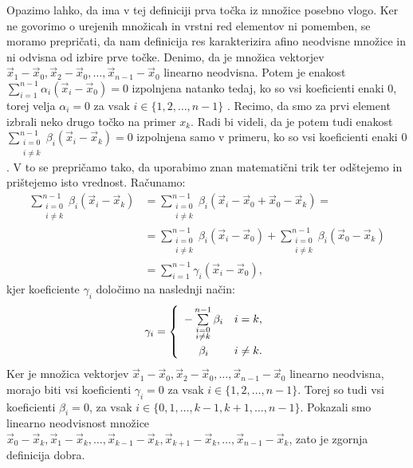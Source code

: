 \documentclass[mat1]{fmfdelo}
\newcommand{\0}{\underline{0}}
\begin{document}
Opazimo lahko, da ima v tej definiciji prva točka iz množice posebno vlogo. Ker ne govorimo o urejenih množicah in vrstni red elementov ni pomemben, se moramo prepričati, da nam definicija res karakterizira afino neodvisne množice in ni odvisna od izbire prve točke. Denimo, da je množica vektorjev $\vec{x}_1 - \vec{x}_0, \vec{x}_2 - \vec{x}_0, \dots , \vec{x}_{n-1} - \vec{x}_0$ linearno neodvisna. Potem je enakost $\sum\limits_{i=1}^{n-1} \alpha_i (\vec{x}_i - \vec{x}_0) = 0$ izpolnjena natanko tedaj, ko so vsi koeficienti enaki $0$, torej velja $\alpha_i = 0$ za vsak $i \in \{ 1, 2, \dots, n - 1 \}$ . Recimo, da smo za prvi element izbrali neko drugo točko na primer $x_k$. Radi bi videli, da je potem tudi enakost $\sum\limits_{\substack{i=0 \\ i\neq k}}^{n-1} \beta_i (\vec{x}_i - \vec{x}_k) = 0$ izpolnjena samo v primeru, ko so vsi koeficienti enaki $0$. V to se prepričamo tako, da uporabimo znan matematični trik ter odštejemo in prištejemo isto vrednost.
Računamo:
\begin{align*} 
\sum\limits_{\substack{i=0 \\ i \neq k}}^{n-1} \beta_i (\vec{x}_i - \vec{x}_k) &=  \sum\limits_{\substack{i=0 \\ i \neq k}}^{n-1} \beta_i (\vec{x}_i - \vec{x}_0 + \vec{x}_0 - \vec{x}_k) = \\
&=\sum\limits_{\substack{i=0 \\ i\neq k}}^{n-1} \beta_i (\vec{x}_i - \vec{x}_0) + \sum\limits_{\substack{i=0 \\ i\neq k}}^{n-1} \beta_i (\vec{x}_0 - \vec{x}_k) \\
&= \sum\limits_{i=1}^{n-1} \gamma_i (\vec{x}_i - \vec{x}_0),
\end{align*}
kjer koeficiente $\gamma_i$ določimo na naslednji način:
\[  \gamma_i =  \left\{
\begin{array}{cl}\vspace{3pt}
	-\sum\limits_{\substack{i=0 \\ i\neq k}}^{n-1} \beta_i & i = k,\\
	\beta_i & i \neq k. \\
\end{array} 
\right. \]
Ker je množica vektorjev $\vec{x}_1 - \vec{x}_0, \vec{x}_2 - \vec{x}_0, \dots , \vec{x}_{n-1} - \vec{x}_0$ linearno neodvisna, morajo biti vsi koeficienti $\gamma_i = 0$ za vsak $i \in \{1, 2, \dots, n-1\}$. Torej so tudi vsi koeficienti $\beta_i = 0$, za vsak $i \in \{0, 1, \dots, k-1, k+1, \dots, n-1\}$. Pokazali smo linearno neodvisnost množice $\vec{x}_0 - \vec{x}_k, \vec{x}_1 - \vec{x}_k, \dots , \vec{x}_{k-1} - \vec{x}_k, \vec{x}_{k+1} - \vec{x}_k, \dots, \vec{x}_{n-1} - \vec{x}_k$, zato je zgornja definicija dobra. 
\end{document}
